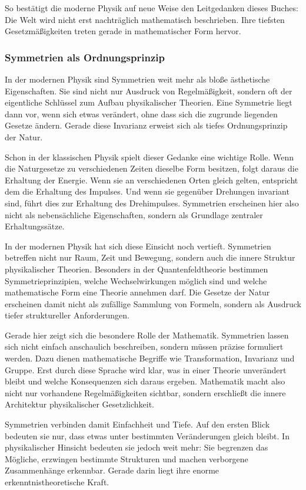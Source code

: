 So bestätigt die moderne Physik auf neue Weise den Leitgedanken dieses Buches: Die Welt wird nicht erst nachträglich mathematisch beschrieben. Ihre tiefsten Gesetzmäßigkeiten treten gerade in mathematischer Form hervor.

\subsubsection{Symmetrien als Ordnungsprinzip}

In der modernen Physik sind Symmetrien weit mehr als bloße ästhetische Eigenschaften. Sie sind nicht nur Ausdruck von Regelmäßigkeit, sondern oft der eigentliche Schlüssel zum Aufbau physikalischer Theorien. Eine Symmetrie liegt dann vor, wenn sich etwas verändert, ohne dass sich die zugrunde liegenden Gesetze ändern. Gerade diese Invarianz erweist sich als tiefes Ordnungsprinzip der Natur.

Schon in der klassischen Physik spielt dieser Gedanke eine wichtige Rolle. Wenn die Naturgesetze zu verschiedenen Zeiten dieselbe Form besitzen, folgt daraus die Erhaltung der Energie. Wenn sie an verschiedenen Orten gleich gelten, entspricht dem die Erhaltung des Impulses. Und wenn sie gegenüber Drehungen invariant sind, führt dies zur Erhaltung des Drehimpulses. Symmetrien erscheinen hier also nicht als nebensächliche Eigenschaften, sondern als Grundlage zentraler Erhaltungssätze.

In der modernen Physik hat sich diese Einsicht noch vertieft. Symmetrien betreffen nicht nur Raum, Zeit und Bewegung, sondern auch die innere Struktur physikalischer Theorien. Besonders in der Quantenfeldtheorie bestimmen Symmetrieprinzipien, welche Wechselwirkungen möglich sind und welche mathematische Form eine Theorie annehmen darf. Die Gesetze der Natur erscheinen damit nicht als zufällige Sammlung von Formeln, sondern als Ausdruck tiefer struktureller Anforderungen.

Gerade hier zeigt sich die besondere Rolle der Mathematik. Symmetrien lassen sich nicht einfach anschaulich beschreiben, sondern müssen präzise formuliert werden. Dazu dienen mathematische Begriffe wie Transformation, Invarianz und Gruppe. Erst durch diese Sprache wird klar, was in einer Theorie unverändert bleibt und welche Konsequenzen sich daraus ergeben. Mathematik macht also nicht nur vorhandene Regelmäßigkeiten sichtbar, sondern erschließt die innere Architektur physikalischer Gesetzlichkeit.

Symmetrien verbinden damit Einfachheit und Tiefe. Auf den ersten Blick bedeuten sie nur, dass etwas unter bestimmten Veränderungen gleich bleibt. In physikalischer Hinsicht bedeuten sie jedoch weit mehr: Sie begrenzen das Mögliche, erzwingen bestimmte Strukturen und machen verborgene Zusammenhänge erkennbar. Gerade darin liegt ihre enorme erkenntnistheoretische Kraft.

